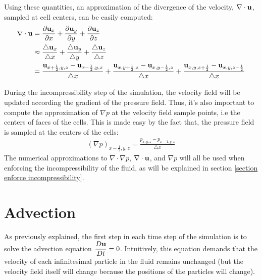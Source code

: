 Using these quantities, an approximation of the divergence of the velocity, $\nabla \cdot \textbf{u}$, sampled at cell centers, can be easily computed:
\begin{equation}
    \begin{aligned}
        \nabla \cdot \textbf{u} 
        &=
        \frac{\partial \textbf{u}_x}{\partial x} +  
        \frac{\partial \textbf{u}_y}{\partial y} +
        \frac{\partial \textbf{u}_z}{\partial z} \\
        &\approx 
        \frac{\triangle \textbf{u}_x}{\triangle x} +  
        \frac{\triangle \textbf{u}_y}{\triangle y} +
        \frac{\triangle \textbf{u}_z}{\triangle z}\\
        &= 
        \frac{\textbf{u}_{x+\frac{1}{2},y,z} - \textbf{u}_{x-\frac{1}{2},y,z}}{\triangle x} +  
        \frac{\textbf{u}_{x,y+\frac{1}{2},z} - \textbf{u}_{x,y-\frac{1}{2},z}}{\triangle x} +
        \frac{\textbf{u}_{x,y,z+\frac{1}{2}} - \textbf{u}_{x,y,z-\frac{1}{2}}}{\triangle x}
    \end{aligned}
    \label{eqn discrete div u}
\end{equation}

During the incompressibility step of the simulation, the velocity field will be updated according the gradient of the pressure field. Thus, it's also important to compute the approximation of $\nabla p$ at the velocity field sample points, i.e the centers of faces of the cells. This is made easy by the fact that, the pressure field is sampled at the centers of the cells:
\begin{equation}
    \label{eqn discrete grad p}
    \begin{aligned}
        (\nabla p)_{x-\frac{1}{2},y,z} = \frac{p_{x,y,z}-p_{x-1,y,z}}{\triangle x}
    \end{aligned}
\end{equation}
The numerical approximations to $\nabla \cdot \nabla p$, $\nabla \cdot \textbf{u}$, and $\nabla p$ will all be used when enforcing the incompressibility of the fluid, as will be explained in section \ref{section enforce incompressibility}.

\section{Advection}

As previously explained, the first step in each time step of the simulation is to solve the advection equation $\dfrac{D\textbf{u}}{Dt} = 0$. Intuitively, this equation demands that the velocity of each infinitesimal particle in the fluid remains unchanged (but the velocity field itself will change because the positions of the particles will change).

